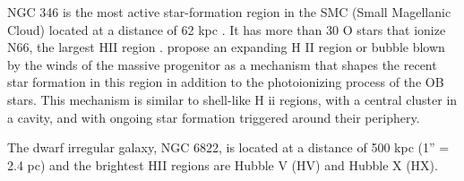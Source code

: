 \documentclass[fleqn,usenatbib, useAMS, a4paper]{mnras}
\begin{document}
NGC 346 is the most active star-formation region in the SMC (Small Magellanic Cloud) located at a distance of 62 kpc \citep{2001ApJ...562..303D}. 
It has more than 30 O stars that ionize N66, the largest HII region \citep{2011ApJ...740...10D}.
\citet{2008ApJ...688.1050G} propose an expanding H II region or bubble blown by the winds of the massive progenitor as a mechanism that shapes the recent star formation in this region in addition to the photoionizing process of the OB stars. 
This mechanism is similar to shell-like H ii regions, with a central cluster in a cavity, and with ongoing star formation triggered around their periphery.

The dwarf irregular galaxy, NGC 6822, is located at a distance of 500 kpc (1'' = 2.4 pc) \citep{2012A&A...540A.135S} and the brightest HII regions are Hubble V (HV) and Hubble X (HX).

\end{document}
